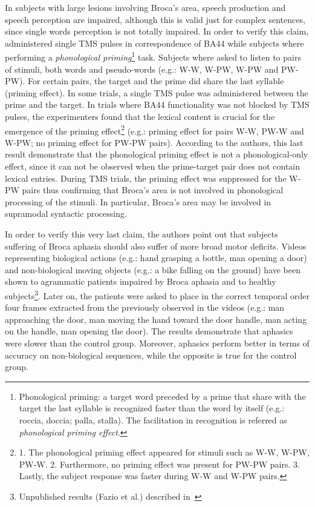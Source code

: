 In subjects with large lesions involving Broca's area, speech production and
speech perception are impaired, although this is valid just for complex
sentences, since single words perception is not totally
impaired.
In order to verify this claim, 
\citet{fadiga.etal:PRESS} administered single TMS pulses in correspondence of
BA44 while subjects where performing a \emph{phonological 
priming}\footnote{Phonological priming: a target word preceded by a prime that
share with the target the last syllable is recognized faster than the word by 
itself (e.g.: roccia, doccia; palla, stalla). The facilitation in recognition is
referred as \emph{phonological priming effect}.} task. 
Subjects where asked to listen to pairs of stimuli, both words and pseudo-words 
(e.g.: W-W, W-PW, W-PW and PW-PW). 
For certain pairs, the target and the prime did share the last syllable (priming
effect). In some trials, a single TMS pulse was administered between the prime
and the target.
In trials where BA44 functionality was not blocked by TMS pulses, the
experimenters found that the lexical content is crucial for the emergence of the
priming effect\footnote{1. The phonological priming effect appeared 
for stimuli such as W-W, W-PW, PW-W. 
2. Furthermore, no priming effect was present for PW-PW pairs.
3. Lastly, the subject response was faster during W-W and W-PW pairs.} (e.g.:
priming effect for pairs W-W, PW-W and W-PW; no priming effect for PW-PW pairs).
According to the authors, this last result demonstrate that the phonological
priming effect is not a phonological-only effect, since it can not be
observed when the prime-target pair does not contain lexical entries.
During TMS trials, the priming effect was suppressed for the W-PW pairs thus
confirming that Broca's area is not involved in phonological processing of the
stimuli. 
In particular, Broca's area may be involved in supramodal syntactic processing.

In order to verify this very last claim, the authors point out that subjects
suffering of Broca aphasia should also suffer of more broad motor
deficits.
Videos representing biological actions (e.g.: hand grasping a bottle, man
opening a door) and non-biological moving objects (e.g.: a bike falling on the 
ground) have been shown to agrammatic patients impaired by Broca
aphasia and to healthy subjects\footnote{Unpublished results (Fazio et al.) 
described in~\citet{fadiga.etal:PRESS}}.
Later on, the patients were asked to place in the correct temporal order four
frames extracted from the previously observed in the videos (e.g.: man
approaching the door, man moving the hand toward the door handle, man acting
on the handle, man opening the door).
The results demonstrate that aphasics were slower than the
control group. Moreover, aphasics perform better in terms of accuracy on 
non-biological sequences, while the opposite is true for the control group.


